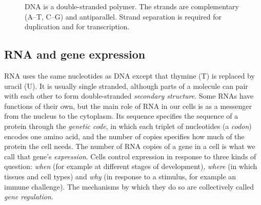 \begin{figure}[t]
  \centering
  \caption{DNA is a double-stranded polymer. The strands are complementary (A--T, C--G) and antiparallel. Strand separation is required for duplication and for transcription.}
  \label{fig:dna}
\end{figure}

\subsection{RNA and gene expression}

RNA uses the same nucleotides as DNA except that thymine (T) is replaced by uracil (U). It is usually single stranded, although parts of a molecule can pair with each other to form double-stranded \emph{secondary structure}. Some RNAs have functions of their own, but the main role of RNA in our cells is as a messenger from the nucleus to the cytoplasm. Its sequence specifies the sequence of a protein through the \emph{genetic code}, in which each triplet of nucleotides (a \emph{codon}) encodes one amino acid, and the number of copies specifies how much of the protein the cell needs. The number of RNA copies of a gene in a cell is what we call that gene's \emph{expression}. Cells control expression in response to three kinds of question: \emph{when} (for example at different stages of development), \emph{where} (in which tissues and cell types) and \emph{why} (in response to a stimulus, for example an immune challenge). The mechanisms by which they do so are collectively called \emph{gene regulation}.

